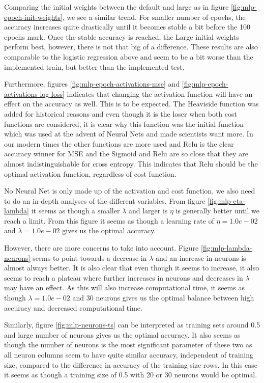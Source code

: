 Comparing the initial weights between the default and large as in figure \ref{fig:mlp-epoch-init-weights}, we see a similar trend. For smaller number of epochs, the accuracy increases quite drastically until it becomes stable a bit before the 100 epochs mark. Once the stable accuracy is reached, the Large initial weights perform best, however, there is not that big of a difference. These results are also comparable to the logistic regression above and seem to be a bit worse than the implemented train, but better than the implemented test. 

Furthermore, figures \ref{fig:mlp-epoch-activations-mse} and \ref{fig:mlp-epoch-activations-log-loss} indicates that changing the activation function will have an effect on the accuracy as well. This is to be expected. The Heaviside function was added for historical reasons and even though it is the loser when both cost functions are considered, it is clear why this function was the initial function which was used at the advent of Neural Nets and made scientists want more. In our modern times the other functions are more used and Relu is the clear accuracy winner for MSE and the Sigmoid and Relu are so close that they are almost indistinguishable for cross entropy. This indicates that Relu should be the optimal activation function, regardless of cost function. 

No Neural Net is only made up of the activation and cost function, we also need to do an in-depth analyses of the different variables. From figure \ref{fig:mlp-eta-lambda} it seems as though a smaller $\lambda$ and larger is $\eta$ is generally better until we reach a limit. From this figure it seems as though a learning rate of $\eta = 1.0e-02$ and $\lambda = 1.0e-02$ gives us the optimal accuracy. 
 
However, there are more concerns to take into account. Figure \ref{fig:mlp-lambda-neurons} seems to point towards a decrease in $\lambda$ and an increase in neurons is almost always better. It is also clear that even though it seems to increase, it also seems to reach a plateau where further increases in neurons and decreases in $\lambda$ may have an effect. As this will also increase computational time, it seems as though $\lambda = 1.0e-02$ and 30 neurons gives us the optimal balance between high accuracy and decreased computational time. 

Similarly, figure \ref{fig:mlp-neurons-ts} can be interpreted as training sets around 0.5 and large number of neurons gives us the optimal accuracy. It also seems as though the number of neurons is the most significant parameter of these two as all neuron columns seem to have quite similar accuracy, independent of training size, compared to the difference in accuracy of the training size rows. In this case it seems as though a training size of 0.5 with 20 or 30 neurons would be optimal. 


